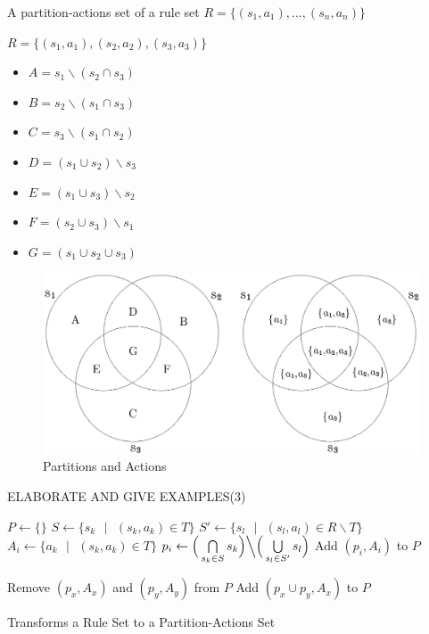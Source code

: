 \documentclass[runningheads,a4paper]{llncs}
\theoremstyle{definition}
\newcommand{\se}{\text{ }}
\begin{document}
\begin{definition}
A partition-actions set of a rule set $R=\{(s_1,a_1),...,(s_n,a_n)\}$
\end{definition}

$R = \{(s_1,a_1),(s_2,a_2),(s_3,a_3)\}$
\begin{itemize}
\item $A = s_1\backslash (s_2 \cap s_3)$ 
\item $B = s_2\backslash (s_1 \cap s_3)$ 
\item $C = s_3\backslash (s_1 \cap s_2)$ 
\item $D = (s_1 \cup s_2 ) \backslash s_3$ 
\item $E = (s_1 \cup s_3 ) \backslash s_2$ 
\item $F = (s_2 \cup s_3 ) \backslash s_1$ 
\item $G = (s_1 \cup s_2 \cup s_3 )$ 
\end{itemize}

\begin{figure}[h]
    \centering
    \includegraphics[scale=0.5]{fig-partitions-1.pdf}
    \caption{Partitions and Actions}
    \label{fig-partition-1}
\end{figure}

ELABORATE AND GIVE EXAMPLES(3)

\begin{algorithm}[H]
\SetAlgoLined
{}
$P \leftarrow \{\}$\;
{
   $S   \leftarrow \{s_k \se|\se (s_k,a_k) \in T\}$             \;
   $S'  \leftarrow \{s_l \se|\se (s_l,a_l) \in R\backslash T\}$ \;
   $A_i \leftarrow \{a_k \se|\se (s_k,a_k) \in T\}$             \; 
   $p_i \leftarrow \Big(\bigcap\limits_{s_k \in  S} s_k \Big)  
                   \Big\backslash 
                   \Big(\bigcup\limits_{s_l \in S'} s_l \Big)$   \;
   {
      Add $(p_i, A_i)$ to $P$ \;
   }
}

{
   {
      Remove $(p_x,A_x)$ and $(p_y,A_y)$ from $P$\;
      Add $(p_x \cup p_y, A_x)$ to $P$ \;
   }
}
\caption{Transforms a Rule Set to a Partition-Actions Set}
\end{algorithm}
\end{document}
